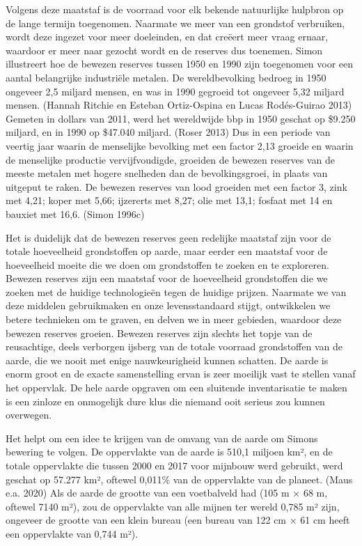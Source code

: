\documentclass[
  a5paper,
  smalldemyvopaper,11pt,twoside,onecolumn,openright,extrafontsizes,
hidelinks]{memoir}
\begin{document}
Volgens deze maatstaf is de voorraad voor elk bekende natuurlijke
hulpbron op de lange termijn toegenomen. Naarmate we meer van een
grondstof verbruiken, wordt deze ingezet voor meer doeleinden, en dat
creëert meer vraag ernaar, waardoor er meer naar gezocht wordt en de
reserves dus toenemen. Simon illustreert hoe de bewezen reserves tussen
1950 en 1990 zijn toegenomen voor een aantal belangrijke industriële
metalen. De wereldbevolking bedroeg in 1950 ongeveer 2,5 miljard mensen,
en was in 1990 gegroeid tot ongeveer 5,32 miljard mensen. (Hannah
Ritchie en Esteban Ortiz-Ospina en Lucas Rodés-Guirao 2013) Gemeten in
dollars van 2011, werd het wereldwijde bbp in 1950 geschat op \$9.250
miljard, en in 1990 op \$47.040 miljard. (Roser 2013) Dus in een periode
van veertig jaar waarin de menselijke bevolking met een factor 2,13
groeide en waarin de menselijke productie vervijfvoudigde, groeiden de
bewezen reserves van de meeste metalen met hogere snelheden dan de
bevolkingsgroei, in plaats van uitgeput te raken. De bewezen reserves
van lood groeiden met een factor 3, zink met 4,21; koper met 5,66;
ijzererts met 8,27; olie met 13,1; fosfaat met 14 en bauxiet met 16,6.
(Simon 1996c)

Het is duidelijk dat de bewezen reserves geen redelijke maatstaf zijn
voor de totale hoeveelheid grondstoffen op aarde, maar eerder een
maatstaf voor de hoeveelheid moeite die we doen om grondstoffen te
zoeken en te exploreren. Bewezen reserves zijn een maatstaf voor de
hoeveelheid grondstoffen die we zoeken met de huidige technologieën
tegen de huidige prijzen. Naarmate we van deze middelen gebruikmaken en
onze levensstandaard stijgt, ontwikkelen we betere technieken om te
graven, en delven we in meer gebieden, waardoor deze bewezen reserves
groeien. Bewezen reserves zijn slechts het topje van de reusachtige,
deels verborgen ijsberg van de totale voorraad grondstoffen van de
aarde, die we nooit met enige nauwkeurigheid kunnen schatten. De aarde
is enorm groot en de exacte samenstelling ervan is zeer moeilijk vast te
stellen vanaf het oppervlak. De hele aarde opgraven om een sluitende
inventarisatie te maken is een zinloze en onmogelijk dure klus die
niemand ooit serieus zou kunnen overwegen.

Het helpt om een idee te krijgen van de omvang van de aarde om Simons
bewering te volgen. De oppervlakte van de aarde is 510,1 miljoen km², en
de totale oppervlakte die tussen 2000 en 2017 voor mijnbouw werd
gebruikt, werd geschat op 57.277 km², oftewel 0,011\% van de oppervlakte
van de planeet. (Maus e.a. 2020) Als de aarde de grootte van een
voetbalveld had (105 m × 68 m, oftewel 7140 m²), zou de oppervlakte van
alle mijnen ter wereld 0,785 m² zijn, ongeveer de grootte van een klein
bureau (een bureau van 122 cm × 61 cm heeft een oppervlakte van 0,744
m²).
\end{document}
